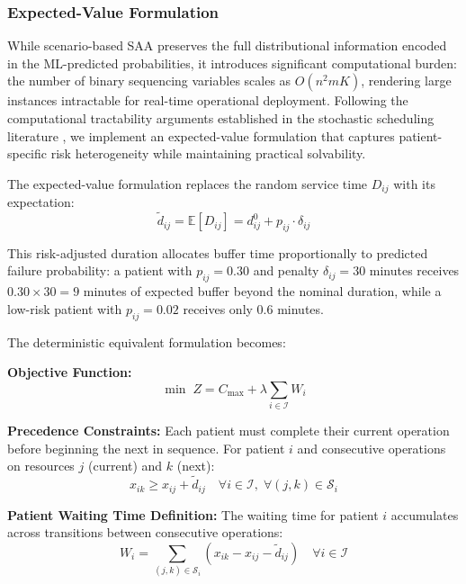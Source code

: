 \documentclass[11pt,a4paper]{article}
\begin{document}
\subsubsection{Expected-Value Formulation}

While scenario-based SAA preserves the full distributional information encoded in the ML-predicted probabilities, it introduces significant computational burden: the number of binary sequencing variables scales as $O(n^2 m K)$, rendering large instances intractable for real-time operational deployment. Following the computational tractability arguments established in the stochastic scheduling literature \citep{denton2003sequential, mancilla2012sample}, we implement an expected-value formulation that captures patient-specific risk heterogeneity while maintaining practical solvability.

The expected-value formulation replaces the random service time $D_{ij}$ with its expectation:
\begin{equation}
\tilde{d}_{ij} = \mathbb{E}[D_{ij}] = d_{ij}^0 + p_{ij} \cdot \delta_{ij}
\label{eq:expected_duration}
\end{equation}

This risk-adjusted duration allocates buffer time proportionally to predicted failure probability: a patient with $p_{ij} = 0.30$ and penalty $\delta_{ij} = 30$ minutes receives $0.30 \times 30 = 9$ minutes of expected buffer beyond the nominal duration, while a low-risk patient with $p_{ij} = 0.02$ receives only 0.6 minutes.

The deterministic equivalent formulation becomes:

\textbf{Objective Function:}
\begin{equation}
\min \; Z = C_{\max} + \lambda \sum_{i \in \mathcal{I}} W_i
\label{eq:objective}
\end{equation}

\textbf{Precedence Constraints:} Each patient must complete their current operation before beginning the next in sequence. For patient $i$ and consecutive operations on resources $j$ (current) and $k$ (next):
\begin{equation}
x_{ik} \geq x_{ij} + \tilde{d}_{ij} \quad \forall i \in \mathcal{I}, \; \forall (j, k) \in \mathcal{S}_i
\label{eq:precedence}
\end{equation}

\textbf{Patient Waiting Time Definition:} The waiting time for patient $i$ accumulates across transitions between consecutive operations:
\begin{equation}
W_i = \sum_{(j,k) \in \mathcal{S}_i} \left( x_{ik} - x_{ij} - \tilde{d}_{ij} \right) \quad \forall i \in \mathcal{I}
\label{eq:wait_time}
\end{equation}
\end{document}

